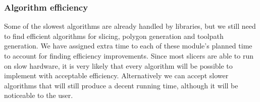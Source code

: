 \subsubsection{Algorithm efficiency}
Some of the slowest algorithms are already handled by libraries, but we still need to find efficient algorithms for slicing, polygon generation and toolpath generation. We have assigned extra time to each of these module's planned time to account for finding efficiency improvements. Since most slicers are able to run on slow hardware, it is very likely that every algorithm will be possible to implement with acceptable efficiency. Alternatively we can accept slower algorithms that will still produce a decent running time, although it will be noticeable to the user.
